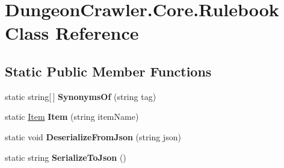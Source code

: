 \hypertarget{class_dungeon_crawler_1_1_core_1_1_rulebook}{}\section{Dungeon\+Crawler.\+Core.\+Rulebook Class Reference}
\label{class_dungeon_crawler_1_1_core_1_1_rulebook}
\subsection*{Static Public Member Functions}
\begin{DoxyCompactItemize}
\item 
\hypertarget{class_dungeon_crawler_1_1_core_1_1_rulebook_a8421b5449b51ff2de2256f88414b94db}{}static string\mbox{[}$\,$\mbox{]} {\bfseries Synonyms\+Of} (string tag)\label{class_dungeon_crawler_1_1_core_1_1_rulebook_a8421b5449b51ff2de2256f88414b94db}

\item 
\hypertarget{class_dungeon_crawler_1_1_core_1_1_rulebook_aa4c46db7c8c18c08ed85ecc7439bda98}{}static \hyperlink{class_dungeon_crawler_1_1_core_1_1_item}{Item} {\bfseries Item} (string item\+Name)\label{class_dungeon_crawler_1_1_core_1_1_rulebook_aa4c46db7c8c18c08ed85ecc7439bda98}

\item 
\hypertarget{class_dungeon_crawler_1_1_core_1_1_rulebook_ad07da757abd45ca3e99c18be74ee845f}{}static void {\bfseries Deserialize\+From\+Json} (string json)\label{class_dungeon_crawler_1_1_core_1_1_rulebook_ad07da757abd45ca3e99c18be74ee845f}

\item 
\hypertarget{class_dungeon_crawler_1_1_core_1_1_rulebook_a9885764a9561d091f425316042987e8b}{}static string {\bfseries Serialize\+To\+Json} ()\label{class_dungeon_crawler_1_1_core_1_1_rulebook_a9885764a9561d091f425316042987e8b}

\end{DoxyCompactItemize}
